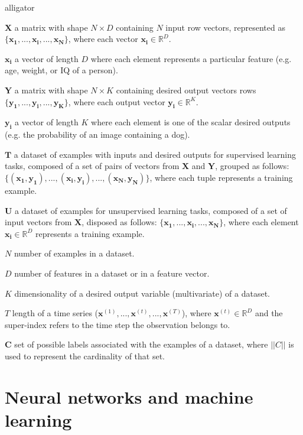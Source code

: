 \begin{labeling}{alligator}
	\item [$\mathbf{X}$] a matrix with shape $N \times D$ containing $N$ input row vectors, represented as $\{\mathbf{x_1},...,\mathbf{x_i},...,\mathbf{x_N}\}$, where each vector $\mathbf{x_i} \in \mathbb{R}^D$.
	\item [$\mathbf{x_i}$] a vector of length $D$ where each element represents a particular feature (e.g. age, weight, or IQ of a person).
	\item [$\mathbf{Y}$] a matrix with shape $N \times K$ containing desired output vectors rows $\{\mathbf{y_1},...,\mathbf{y_i},...,\mathbf{y_K}\}$, where each output vector $\mathbf{y_i} \in \mathbb{R}^K$.
	\item [$\mathbf{y_i}$]  a vector of length $K$ where each element is one of the scalar desired outputs (e.g. the probability of an image containing a dog).
	\item [$\mathbf{T}$] a dataset  of examples with inputs and desired outputs for supervised learning tasks, composed of a set of pairs of vectors from $\mathbf{X}$ and $\mathbf{Y}$, grouped as follows: $\{(\mathbf{x_1}, \mathbf{y_1}),...,(\mathbf{x_i}, \mathbf{y_i}),...,(\mathbf{x_N}, \mathbf{y_N})\}$, where each tuple represents a training example.
	\item [$\mathbf{U}$] a dataset of examples for unsupervised learning tasks, composed of a set of input vectors from $\mathbf{X}$, disposed as follows: $\{\mathbf{x_1},...,\mathbf{x_i},...,\mathbf{x_N}\}$, where each element $\mathbf{x_i} \in \mathbb{R}^D$ represents a training example.
	\item [$N$] number of examples in a dataset.
	\item [$D$]  number of features in a dataset or in a feature vector.
	\item [$K$] dimensionality of a desired output variable (multivariate) of a dataset.
	\item [$T$] length of a time series ($\mathbf{x}^{(1)}, ..., \mathbf{x}^{(t)}, ..., \mathbf{x}^{(T)}$), where $\mathbf{x}^{(t)} \in \mathbb{R}^D$ and the super-index refers to the time step the observation belongs to.
	\item [$\mathbf{C}$] set of possible labels associated with the examples of a dataset, where $||C||$ is used to represent the cardinality of that set.
\end{labeling}

\section*{Neural networks and machine learning}

